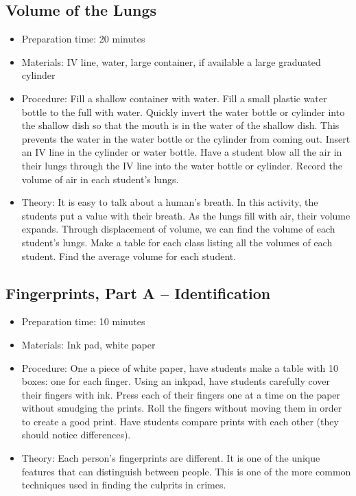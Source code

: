 \subsection{Volume of the Lungs}
\begin{itemize}
\item{Preparation time: 20 minutes}
\item{Materials: IV line, water, large container, if available a large graduated cylinder}
\item{Procedure: Fill a shallow container with water. Fill a small plastic water bottle to the full with water. Quickly invert the water bottle or cylinder into the shallow dish so that the mouth is in the water of the shallow dish. This prevents the water in the water bottle or the cylinder from coming out. Insert an IV line in the cylinder or water bottle. Have a student blow all the air in their lungs through the IV line into the water bottle or cylinder. Record the volume of air in each student’s lungs.}
\item{Theory: It is easy to talk about a human’s breath. In this activity, the students put a value with their breath. As the lungs fill with air, their volume expands. Through displacement of volume, we can find the volume of each student’s lungs. Make a table for each class listing all the volumes of each student. Find the average volume for each student.}
\end{itemize}

\subsection{Fingerprints, Part A -- Identification}
\begin{itemize}
\item{Preparation time: 10 minutes}
\item{Materials: Ink pad, white paper}
\item{Procedure: One a piece of white paper, have students make a table with 10 boxes: one for each finger. Using an inkpad, have students carefully cover their fingers with ink. Press each of their fingers one at a time on the paper without smudging the prints. Roll the fingers without moving them in order to create a good print. Have students compare prints with each other (they should notice differences).}
\item{Theory: Each person’s fingerprints are different. It is one of the unique features that can distinguish between people. This is one of the more common techniques used in finding the culprits in crimes.}
\end{itemize}

